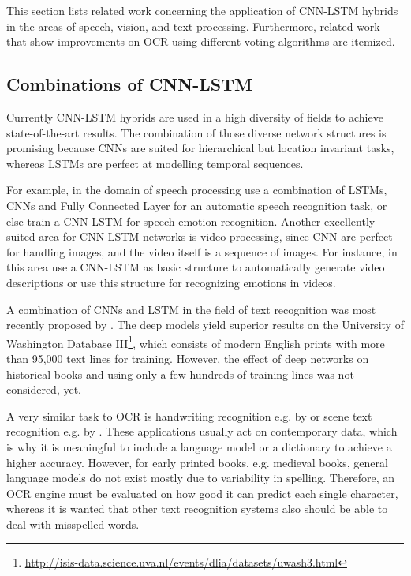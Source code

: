 \documentclass{jlcl}
\begin{document}
This section lists related work concerning the application of CNN-LSTM hybrids in the areas of speech, vision, and text processing.
Furthermore, related work that show improvements on OCR using different voting algorithms are itemized.

\subsection{Combinations of CNN-LSTM}
Currently CNN-LSTM hybrids are used in a high diversity of fields to achieve state-of-the-art results.
The combination of those diverse network structures is promising because CNNs are suited for  hierarchical but location invariant tasks, whereas LSTMs are perfect at modelling temporal sequences.

For example, in the domain of speech processing \cite{sainath:2015:speech_cnn_lstm} use a combination of LSTMs, CNNs and Fully Connected Layer for an automatic speech recognition task, or else \cite{Trigeorgis:2016:Speech_emotion_recognition} train a CNN-LSTM for speech emotion recognition.
Another excellently suited area for CNN-LSTM networks is video processing, since CNN are perfect for handling images, and the video itself is a sequence of images.
For instance, in this area \cite{donahue:2015:LSTM-CNN-Visual-Description} use a CNN-LSTM as basic structure to automatically generate video descriptions or
\cite{Fan:2016:Video-Emotion-Recognition} use this structure for recognizing emotions in videos.

A combination of CNNs and LSTM in the field of text recognition was most recently proposed by \cite{breuel17hybridCNN-LSTM}.
The deep models yield superior results on the University of Washington Database III\footnote{\url{http://isis-data.science.uva.nl/events/dlia/datasets/uwash3.html}}, which consists of modern English prints with more than 95,000 text lines for training.
However, the effect of deep networks on historical books and using only a few hundreds of training lines was not considered, yet.

A very similar task to OCR is handwriting recognition e.g. by \cite{graves2009handwriting} or scene text recognition e.g. by \cite{shi:2017:scene-text}.
These applications usually act on contemporary data, which is why it is meaningful to include a language model or a dictionary to achieve a higher accuracy.
However, for early printed books, e.g. medieval books, general language models do not exist mostly due to variability in spelling.
Therefore, an OCR engine must be evaluated on how good it can predict each single character, whereas it is wanted that other text recognition systems also should be able to deal with misspelled words.
\end{document}
